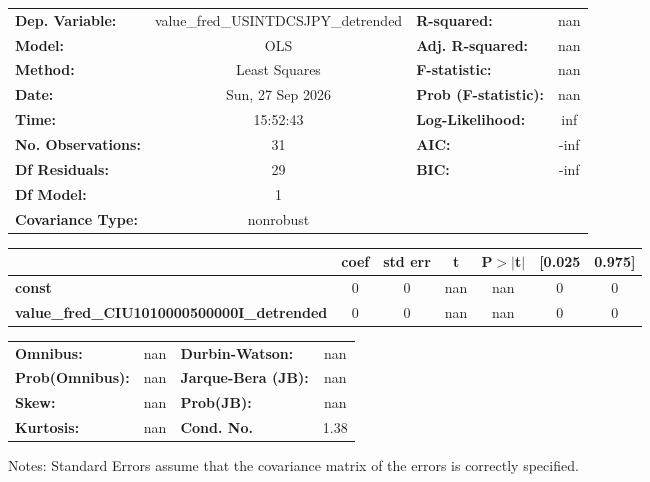 \begin{center}
\begin{tabular}{lclc}
\toprule
\textbf{Dep. Variable:}                            & value\_fred\_USINTDCSJPY\_detrended & \textbf{  R-squared:         } &       nan   \\
\textbf{Model:}                                    &                 OLS                 & \textbf{  Adj. R-squared:    } &       nan   \\
\textbf{Method:}                                   &            Least Squares            & \textbf{  F-statistic:       } &       nan   \\
\textbf{Date:}                                     &           Sun, 27 Sep 2026          & \textbf{  Prob (F-statistic):} &      nan    \\
\textbf{Time:}                                     &               15:52:43              & \textbf{  Log-Likelihood:    } &       inf   \\
\textbf{No. Observations:}                         &                    31               & \textbf{  AIC:               } &      -inf   \\
\textbf{Df Residuals:}                             &                    29               & \textbf{  BIC:               } &      -inf   \\
\textbf{Df Model:}                                 &                     1               & \textbf{                     } &             \\
\textbf{Covariance Type:}                          &              nonrobust              & \textbf{                     } &             \\
\bottomrule
\end{tabular}
\begin{tabular}{lcccccc}
                                                   & \textbf{coef} & \textbf{std err} & \textbf{t} & \textbf{P$> |$t$|$} & \textbf{[0.025} & \textbf{0.975]}  \\
\midrule
\textbf{const}                                     &            0  &            0     &       nan  &           nan        &            0    &            0     \\
\textbf{value\_fred\_CIU1010000500000I\_detrended} &            0  &            0     &       nan  &           nan        &            0    &            0     \\
\bottomrule
\end{tabular}
\begin{tabular}{lclc}
\textbf{Omnibus:}       &    nan & \textbf{  Durbin-Watson:     } &      nan  \\
\textbf{Prob(Omnibus):} &    nan & \textbf{  Jarque-Bera (JB):  } &      nan  \\
\textbf{Skew:}          &    nan & \textbf{  Prob(JB):          } &      nan  \\
\textbf{Kurtosis:}      &    nan & \textbf{  Cond. No.          } &     1.38  \\
\bottomrule
\end{tabular}
\end{center}

Notes: \newline
 [1] Standard Errors assume that the covariance matrix of the errors is correctly specified.